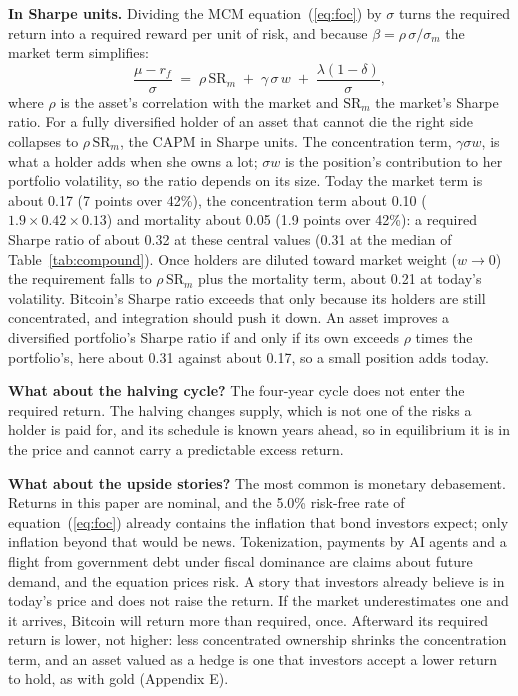 \documentclass[11pt]{article}
\begin{document}
\textbf{In Sharpe units.} Dividing the MCM equation~(\ref{eq:foc}) by $\sigma$ turns the required return into a required reward per unit of risk, and because $\beta = \rho\,\sigma/\sigma_m$ the market term simplifies:
\begin{equation}
\frac{\mu - r_f}{\sigma} \;=\; \rho\,\mathrm{SR}_m \;+\; \gamma\,\sigma\,w \;+\; \frac{\lambda(1-\delta)}{\sigma},
\label{eq:sharpe}
\end{equation}
where $\rho$ is the asset's correlation with the market and $\mathrm{SR}_m$ the market's Sharpe ratio. For a fully diversified holder of an asset that cannot die the right side collapses to $\rho\,\mathrm{SR}_m$, the CAPM in Sharpe units. The concentration term, $\gamma\sigma w$, is what a holder adds when she owns a lot; $\sigma w$ is the position's contribution to her portfolio volatility, so the ratio depends on its size. Today the market term is about 0.17 (7 points over 42\%), the concentration term about 0.10 ($1.9 \times 0.42 \times 0.13$) and mortality about 0.05 (1.9 points over 42\%): a required Sharpe ratio of about 0.32 at these central values (0.31 at the median of Table~\ref{tab:compound}). Once holders are diluted toward market weight ($w \to 0$) the requirement falls to $\rho\,\mathrm{SR}_m$ plus the mortality term, about 0.21 at today's volatility. Bitcoin's Sharpe ratio exceeds that only because its holders are still concentrated, and integration should push it down. An asset improves a diversified portfolio's Sharpe ratio if and only if its own exceeds $\rho$ times the portfolio's, here about 0.31 against about 0.17, so a small position adds today.

\textbf{What about the halving cycle?} The four-year cycle does not enter the required return. The halving changes supply, which is not one of the risks a holder is paid for, and its schedule is known years ahead, so in equilibrium it is in the price and cannot carry a predictable excess return.

\textbf{What about the upside stories?} The most common is monetary debasement. Returns in this paper are nominal, and the 5.0\% risk-free rate of equation~(\ref{eq:foc}) already contains the inflation that bond investors expect; only inflation beyond that would be news. Tokenization, payments by AI agents and a flight from government debt under fiscal dominance are claims about future demand, and the equation prices risk. A story that investors already believe is in today's price and does not raise the return. If the market underestimates one and it arrives, Bitcoin will return more than required, once. Afterward its required return is lower, not higher: less concentrated ownership shrinks the concentration term, and an asset valued as a hedge is one that investors accept a lower return to hold, as with gold (Appendix E).
\end{document}
